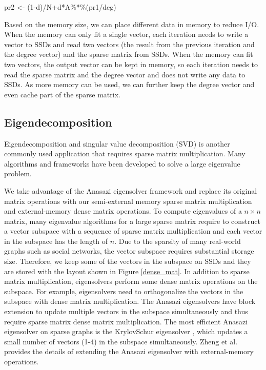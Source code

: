 pr2 <- (1-d)/N+d*A\%*\%(pr1/deg)

Based on the memory size, we can place different data in memory to reduce I/O.
When the memory can only fit a single vector, each iteration needs
to write a vector to SSDs and read two vectors (the result from
the previous iteration and the degree vector) and the sparse matrix
from SSDs. When the memory can fit two vectors, the output vector can be kept
in memory, so each iteration needs to read the sparse matrix and the degree vector
and does not write any data to SSDs. As more memory can be used, we can
further keep the degree vector and even cache part of the sparse matrix.

\subsection{Eigendecomposition}
Eigendecomposition and singular value decomposition (SVD) is another commonly
used application that requires sparse matrix multiplication. Many
algorithms \cite{Lanczos, IRLM, krylovschur} and frameworks
\cite{arpack, anasazi, slepc} have been developed to solve a large eigenvalue
problem.

We take advantage of the Anasazi eigensolver framework \cite{anasazi} and
replace its original matrix operations with our semi-external memory sparse
matrix multiplication and external-memory dense matrix operations. To compute
eigenvalues of a $n \times n$ matrix, many eigenvalue algorithms for a large
sparse matrix require to construct a vector subspace with a sequence of
sparse matrix multiplication and each vector in the subspace has the length of $n$.
Due to the sparsity of many real-world graphs such as social networks,
the vector subspace requires substantial storage size. Therefore, we keep
some of the vectors in the subspace on SSDs and they are stored with the layout
shown in Figure \ref{dense_mat}. In addition to sparse matrix
multiplication, eigensolvers perform some dense matrix operations on the subspace.
For example, eigensolvers need to orthogonalize the vectors in the subspace with
dense matrix multiplication. The Anasazi eigensolvers have block extension to
update multiple
vectors in the subspace simultaneously and thus require sparse matrix dense
matrix multiplication. The most efficient Anasazi eigensolver on sparse graphs
is the KrylovSchur eigensolver \cite{krylovschur}, which updates a small number
of vectors (1-4) in the subspace simultaneously. Zheng et al.
\cite{flasheigen} provides the details of extending the Anasazi eigensolver
with external-memory operations.

